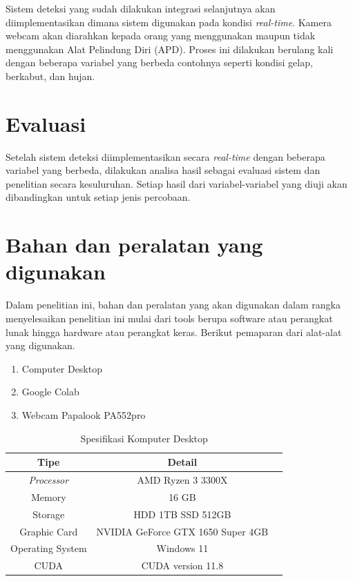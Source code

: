 Sistem deteksi yang sudah dilakukan integrasi selanjutnya akan diimplementasikan dimana sistem digunakan pada kondisi \textit{real-time}. Kamera webcam akan diarahkan kepada orang yang menggunakan maupun tidak menggunakan Alat Pelindung Diri (APD). Proses ini dilakukan berulang kali dengan beberapa variabel yang berbeda contohnya seperti kondisi gelap, berkabut, dan hujan.

\section{Evaluasi}
\label{subsec:evaluasi}

Setelah sistem deteksi diimplementasikan secara \emph{real-time} dengan beberapa variabel yang berbeda, dilakukan analisa hasil sebagai evaluasi sistem dan penelitian secara kesuluruhan. Setiap hasil dari variabel-variabel yang diuji akan dibandingkan untuk setiap jenis percobaan.

\section{Bahan dan peralatan yang digunakan}
\label{subsec:peralatan}

Dalam penelitian ini, bahan dan peralatan yang akan digunakan dalam rangka menyelesaikan penelitian ini mulai dari tools berupa software atau perangkat lunak hingga hardware atau perangkat keras. Berikut pemaparan dari alat-alat yang digunakan.

\begin{enumerate}[nolistsep]
  \item Computer Desktop
  \item Google Colab
  \item Webcam Papalook PA552pro
\end{enumerate}

\begin{longtable}{|c|c|c|}
  \caption{Spesifikasi Komputer Desktop}
  \label{tb:spesifikasikomputer}                         \\
  \hline
  \textbf{Tipe}      & \textbf{Detail}                   \\
  \hline
  \textit{Processor} & AMD Ryzen 3 3300X                 \\
  Memory             & 16 GB                             \\
  Storage            & HDD 1TB SSD 512GB                 \\
  Graphic Card       & NVIDIA GeForce GTX 1650 Super 4GB \\
  Operating System   & Windows 11                        \\
  CUDA               & CUDA version 11.8                 \\
  \hline
\end{longtable}

